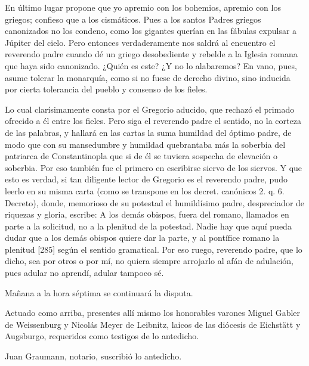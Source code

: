 En último lugar propone que yo apremio con los bohemios, apremio con los griegos; confieso que a los cismáticos. Pues a los santos Padres griegos canonizados no los condeno, como los gigantes querían en las fábulas expulsar a Júpiter del cielo. Pero entonces verdaderamente nos saldrá al encuentro el reverendo padre cuando dé un griego desobediente y rebelde a la Iglesia romana que haya sido canonizado. ¿Quién es este? ¿Y no lo alabaremos? En vano, pues, asume tolerar la monarquía, como si no fuese de derecho divino, sino inducida por cierta tolerancia del pueblo y consenso de los fieles.

Lo cual clarísimamente consta por el Gregorio aducido, que rechazó el primado ofrecido a él entre los fieles. Pero siga el reverendo padre el sentido, no la corteza de las palabras, y hallará en las cartas la suma humildad del óptimo padre, de modo que con su mansedumbre y humildad quebrantaba más la soberbia del patriarca de Constantinopla que si de él se tuviera sospecha de elevación o soberbia. Por eso también fue el primero en escribirse siervo de los siervos. Y que esto es verdad, si tan diligente lector de Gregorio es el reverendo padre, pudo leerlo en su misma carta (como se transpone en los decret. canónicos 2. q. 6. Decreto), donde, memorioso de su potestad el humildísimo padre, despreciador de riquezas y gloria, escribe: A los demás obispos, fuera del romano, llamados en parte a la solicitud, no a la plenitud de la potestad. Nadie hay que aquí pueda dudar que a los demás obispos quiere dar la parte, y al pontífice romano la plenitud [285] según el sentido gramatical. Por eso ruego, reverendo padre, que lo dicho, sea por otros o por mí, no quiera siempre arrojarlo al afán de adulación, pues adular no aprendí, adular tampoco sé.

Mañana a la hora séptima se continuará la disputa.

Actuado como arriba, presentes allí mismo los honorables varones Miguel Gabler de Weissenburg y Nicolás Meyer de Leibnitz, laicos de las diócesis de Eichstätt y Augsburgo, requeridos como testigos de lo antedicho.

Juan Graumann, notario, suscribió lo antedicho.


